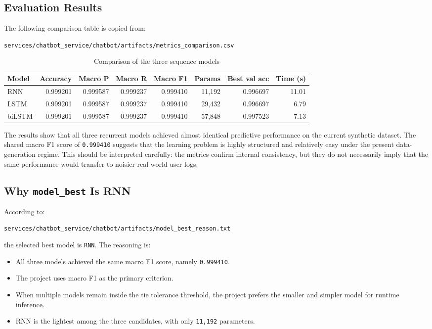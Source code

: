 \documentclass[12pt,a4paper]{article}
\begin{document}
\subsection{Evaluation Results}
The following comparison table is copied from:
\begin{center}
\texttt{services/chatbot\_service/chatbot/artifacts/metrics\_comparison.csv}
\end{center}

\begin{table}[H]
\centering
\caption{Comparison of the three sequence models}
\begin{tabular}{lrrrrrrr}
\toprule
Model & Accuracy & Macro P & Macro R & Macro F1 & Params & Best val acc & Time (s) \\
\midrule
RNN & 0.999201 & 0.999587 & 0.999237 & 0.999410 & 11,192 & 0.996697 & 11.01 \\
LSTM & 0.999201 & 0.999587 & 0.999237 & 0.999410 & 29,432 & 0.996697 & 6.79 \\
biLSTM & 0.999201 & 0.999587 & 0.999237 & 0.999410 & 57,848 & 0.997523 & 7.13 \\
\bottomrule
\end{tabular}
\end{table}

The results show that all three recurrent models achieved almost identical predictive performance on the current synthetic dataset. The shared macro F1 score of \texttt{0.999410} suggests that the learning problem is highly structured and relatively easy under the present data-generation regime. This should be interpreted carefully: the metrics confirm internal consistency, but they do not necessarily imply that the same performance would transfer to noisier real-world user logs.

\subsection{Why \texttt{model\_best} Is RNN}
According to:
\begin{center}
\texttt{services/chatbot\_service/chatbot/artifacts/model\_best\_reason.txt}
\end{center}
the selected best model is \texttt{RNN}. The reasoning is:
\begin{itemize}
  \item All three models achieved the same macro F1 score, namely \texttt{0.999410}.
  \item The project uses macro F1 as the primary criterion.
  \item When multiple models remain inside the tie tolerance threshold, the project prefers the smaller and simpler model for runtime inference.
  \item RNN is the lightest among the three candidates, with only \texttt{11,192} parameters.
\end{itemize}
\end{document}
